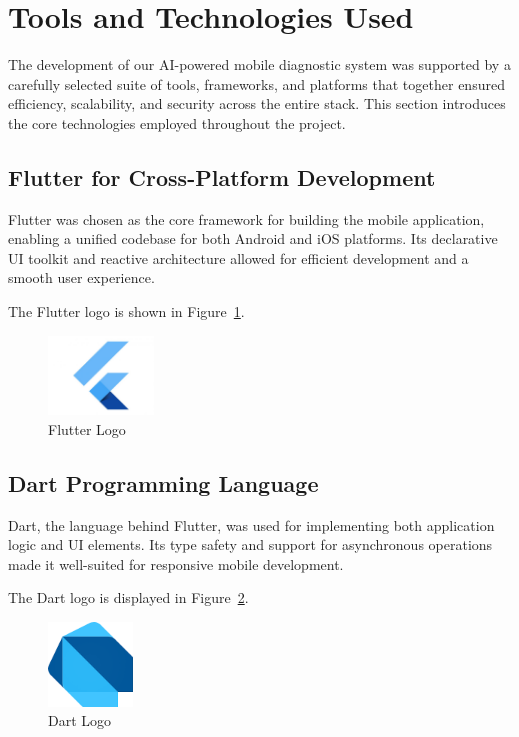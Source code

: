 \section{Tools and Technologies Used}  
\label{sec:tools_tech}

The development of our AI-powered mobile diagnostic system was supported by a carefully selected suite of tools, frameworks, and platforms that together ensured efficiency, scalability, and security across the entire stack. This section introduces the core technologies employed throughout the project.

\subsection{Flutter for Cross-Platform Development}

Flutter was chosen as the core framework for building the mobile application, enabling a unified codebase for both Android and iOS platforms. Its declarative UI toolkit and reactive architecture allowed for efficient development and a smooth user experience.

The Flutter logo is shown in Figure~\ref{fig:flutter_logo}.

\begin{figure}[H]
    \centering
    \includegraphics[width=0.25\textwidth]{images/tools/flutter.png}
    \caption{Flutter Logo}
    \label{fig:flutter_logo}
\end{figure}

\subsection{Dart Programming Language}

Dart, the language behind Flutter, was used for implementing both application logic and UI elements. Its type safety and support for asynchronous operations made it well-suited for responsive mobile development.

The Dart logo is displayed in Figure~\ref{fig:dart_logo}.

\begin{figure}[H]
    \centering
    \includegraphics[width=0.2\textwidth]{images/tools/dart.png}
    \caption{Dart Logo}
    \label{fig:dart_logo}
\end{figure}

